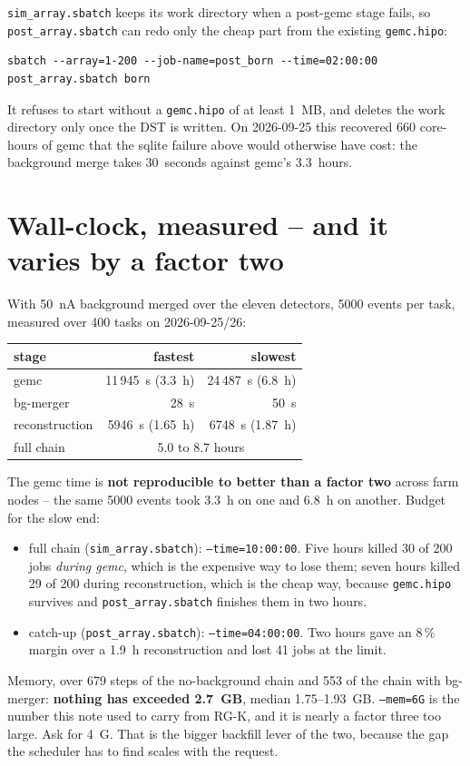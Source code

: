 \documentclass[11pt]{article}
\begin{document}
\texttt{sim\_array.sbatch} keeps its work directory when a post-gemc stage fails, so
\texttt{post\_array.sbatch} can redo only the cheap part from the existing \texttt{gemc.hipo}:
\begin{lstlisting}
sbatch --array=1-200 --job-name=post_born --time=02:00:00 post_array.sbatch born
\end{lstlisting}
It refuses to start without a \texttt{gemc.hipo} of at least 1~MB, and deletes the work
directory only once the DST is written. On 2026-09-25 this recovered 660 core-hours of gemc
that the sqlite failure above would otherwise have cost: the background merge takes 30~seconds
against gemc's 3.3~hours.

\section{Wall-clock, measured -- and it varies by a factor two}
With 50~nA background merged over the eleven detectors, 5000 events per task, measured over
400 tasks on 2026-09-25/26:
\begin{center}
\begin{tabular}{lrr}
\hline
stage & fastest & slowest \\
\hline
gemc                    & 11\,945~s (3.3~h) & 24\,487~s (6.8~h) \\
bg-merger               & 28~s              & 50~s \\
reconstruction          & 5946~s (1.65~h)   & 6748~s (1.87~h) \\
\hline
full chain              & \multicolumn{2}{c}{5.0 to 8.7 hours} \\
\hline
\end{tabular}
\end{center}
The gemc time is \textbf{not reproducible to better than a factor two} across farm nodes --
the same 5000 events took 3.3~h on one and 6.8~h on another. Budget for the slow end:
\begin{itemize}
\item full chain (\texttt{sim\_array.sbatch}): \texttt{--time=10:00:00}. Five hours killed 30
  of 200 jobs \emph{during gemc}, which is the expensive way to lose them; seven hours killed
  29 of 200 during reconstruction, which is the cheap way, because \texttt{gemc.hipo} survives
  and \texttt{post\_array.sbatch} finishes them in two hours.
\item catch-up (\texttt{post\_array.sbatch}): \texttt{--time=04:00:00}. Two hours gave an 8\,\%
  margin over a 1.9~h reconstruction and lost 41 jobs at the limit.
\end{itemize}
Memory, over 679 steps of the no-background chain and 553 of the chain with bg-merger:
\textbf{nothing has exceeded 2.7~GB}, median 1.75--1.93~GB. \texttt{--mem=6G} is the number
this note used to carry from RG-K, and it is nearly a factor three too large. Ask for 4~G.
That is the bigger backfill lever of the two, because the gap the scheduler has to find scales
with the request.
\end{document}
